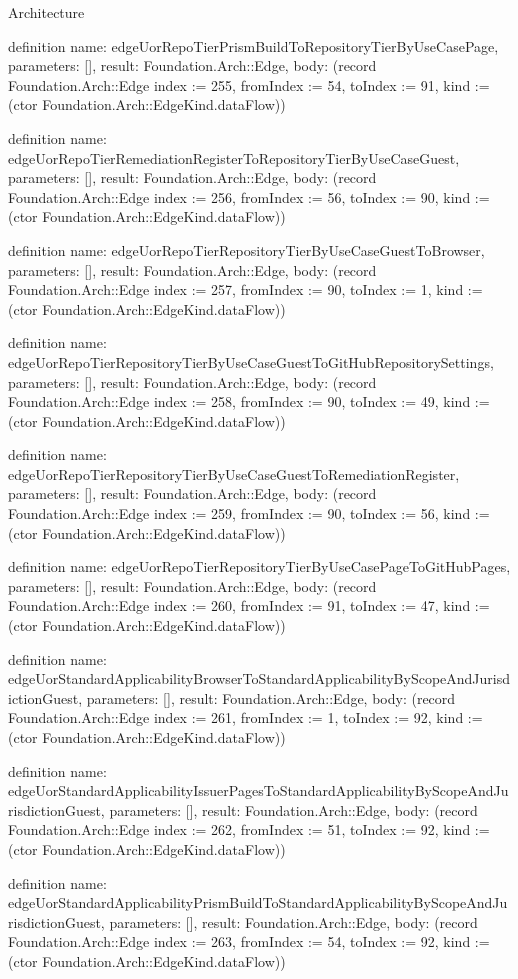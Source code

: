 \begin{lexlean}{Architecture}
\begin{semanticmodule}
definition{
  name: edgeUorRepoTierPrismBuildToRepositoryTierByUseCasePage,
  parameters: [],
  result: Foundation.Arch::Edge,
  body: (record Foundation.Arch::Edge {index := 255, fromIndex := 54, toIndex := 91, kind := (ctor Foundation.Arch::EdgeKind.dataFlow)})
}

definition{
  name: edgeUorRepoTierRemediationRegisterToRepositoryTierByUseCaseGuest,
  parameters: [],
  result: Foundation.Arch::Edge,
  body: (record Foundation.Arch::Edge {index := 256, fromIndex := 56, toIndex := 90, kind := (ctor Foundation.Arch::EdgeKind.dataFlow)})
}

definition{
  name: edgeUorRepoTierRepositoryTierByUseCaseGuestToBrowser,
  parameters: [],
  result: Foundation.Arch::Edge,
  body: (record Foundation.Arch::Edge {index := 257, fromIndex := 90, toIndex := 1, kind := (ctor Foundation.Arch::EdgeKind.dataFlow)})
}

definition{
  name: edgeUorRepoTierRepositoryTierByUseCaseGuestToGitHubRepositorySettings,
  parameters: [],
  result: Foundation.Arch::Edge,
  body: (record Foundation.Arch::Edge {index := 258, fromIndex := 90, toIndex := 49, kind := (ctor Foundation.Arch::EdgeKind.dataFlow)})
}

definition{
  name: edgeUorRepoTierRepositoryTierByUseCaseGuestToRemediationRegister,
  parameters: [],
  result: Foundation.Arch::Edge,
  body: (record Foundation.Arch::Edge {index := 259, fromIndex := 90, toIndex := 56, kind := (ctor Foundation.Arch::EdgeKind.dataFlow)})
}

definition{
  name: edgeUorRepoTierRepositoryTierByUseCasePageToGitHubPages,
  parameters: [],
  result: Foundation.Arch::Edge,
  body: (record Foundation.Arch::Edge {index := 260, fromIndex := 91, toIndex := 47, kind := (ctor Foundation.Arch::EdgeKind.dataFlow)})
}

definition{
  name: edgeUorStandardApplicabilityBrowserToStandardApplicabilityByScopeAndJurisdictionGuest,
  parameters: [],
  result: Foundation.Arch::Edge,
  body: (record Foundation.Arch::Edge {index := 261, fromIndex := 1, toIndex := 92, kind := (ctor Foundation.Arch::EdgeKind.dataFlow)})
}

definition{
  name: edgeUorStandardApplicabilityIssuerPagesToStandardApplicabilityByScopeAndJurisdictionGuest,
  parameters: [],
  result: Foundation.Arch::Edge,
  body: (record Foundation.Arch::Edge {index := 262, fromIndex := 51, toIndex := 92, kind := (ctor Foundation.Arch::EdgeKind.dataFlow)})
}

definition{
  name: edgeUorStandardApplicabilityPrismBuildToStandardApplicabilityByScopeAndJurisdictionGuest,
  parameters: [],
  result: Foundation.Arch::Edge,
  body: (record Foundation.Arch::Edge {index := 263, fromIndex := 54, toIndex := 92, kind := (ctor Foundation.Arch::EdgeKind.dataFlow)})
}


\end{semanticmodule}
\end{lexlean}
